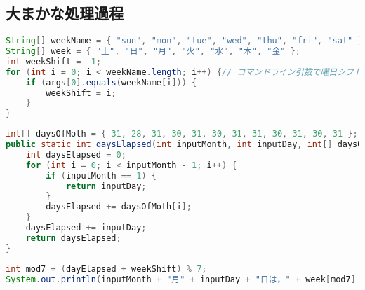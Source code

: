 \documentclass[a4j,11pt]{jsarticle}
\begin{document}
\subsection{大まかな処理過程}
\begin{lstlisting}[caption=コマンドライン引数から曜日シフトを決定, label=曜日シフト, language=Java]
String[] weekName = { "sun", "mon", "tue", "wed", "thu", "fri", "sat" };
String[] week = { "土", "日", "月", "火", "水", "木", "金" };
int weekShift = -1;
for (int i = 0; i < weekName.length; i++) {// コマンドライン引数で曜日シフト数を決定．
    if (args[0].equals(weekName[i])) {
        weekShift = i;
    }
}
\end{lstlisting}
\begin{lstlisting}[caption=経過日数を算出, label=経過日数を算出, language=Java]
int[] daysOfMoth = { 31, 28, 31, 30, 31, 30, 31, 31, 30, 31, 30, 31 };
public static int daysElapsed(int inputMonth, int inputDay, int[] daysOfMoth) {
    int daysElapsed = 0;
    for (int i = 0; i < inputMonth - 1; i++) {
        if (inputMonth == 1) {
            return inputDay;
        }
        daysElapsed += daysOfMoth[i];
    }
    daysElapsed += inputDay;
    return daysElapsed;
}
\end{lstlisting}
\begin{lstlisting}[caption=出力, label=出力, language=Java]
int mod7 = (dayElapsed + weekShift) % 7;
System.out.println(inputMonth + "月" + inputDay + "日は，" + week[mod7] +"曜日です．");
\end{lstlisting}
\newpage
\end{document}
